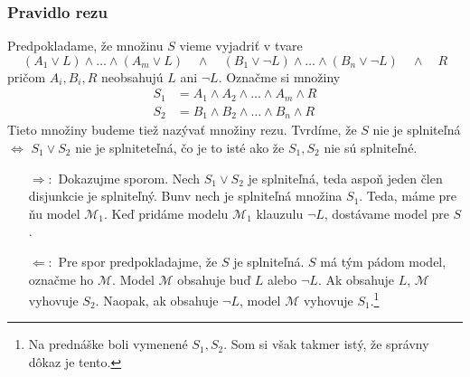 \subsubsection{Pravidlo rezu}
Predpokladame, že množinu $S$ vieme vyjadriť v tvare
\begin{equation*}
    (A_1 \lor L) \land \ldots \land (A_m \lor L) \quad \land \quad
    (B_1 \lor \neg L) \land \ldots \land (B_n \lor \neg L) 
    \quad \land \quad R
\end{equation*}
pričom $A_i, B_i, R$ neobsahujú $L$ ani $\neg L$.
Označme si množiny
\begin{align*}
    S_1 &= A_1 \land A_2 \land \ldots \land A_m \land R \\
    S_2 &= B_1 \land B_2 \land \ldots \land B_n \land R
\end{align*}
Tieto množiny budeme tiež nazývať množiny rezu.
Tvrdíme, že $S$ nie je splniteľná $\iff$ $S_1 \lor S_2$ nie je
splniteteľná, čo je to isté ako že $S_1,S_2$ nie sú splniteľné.

\begin{dokaz}
    \noindent
    \begin{itemize}
    \item[$\Rightarrow:$] Dokazujme sporom.
        Nech $S_1 \lor S_2$ je splniteľná, 
        teda aspoň jeden člen disjunkcie je splniteľný.
        Bunv nech je splniteľná množina $S_1$. Teda, máme pre ňu model
        $\mathcal{M}_1$. Keď pridáme modelu $\mathcal{M}_1$ 
        klauzulu $\neg L$, dostávame model pre $S$.

    \item[$\Leftarrow:$] Pre spor predpokladajme, že $S$ je splniteľná.
        $S$ má tým pádom model, označme ho $\mathcal{M}$.
        Model $\mathcal{M}$ obsahuje buď $L$ alebo $\neg L$.
        Ak obsahuje $L$, $\mathcal{M}$ vyhovuje $S_2$. Naopak, ak
        obsahuje $\neg L$, model $\mathcal{M}$ vyhovuje
        $S_1$.\footnote{Na prednáške boli vymenené $S_1,S_2$. Som si
        však takmer istý, že správny dôkaz je tento.}
    \end{itemize}
\end{dokaz}

